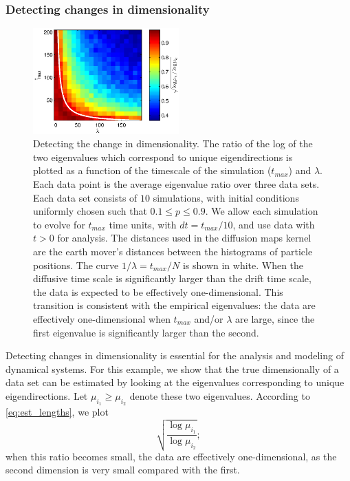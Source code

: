 \documentclass[preprint]{elsarticle}
\begin{document}
\subsubsection{Detecting changes in dimensionality}

\begin{figure}[t]
%
\centering
\includegraphics[width=0.5\textwidth]{tmax_lambda_transition}
%
\caption{Detecting the change in dimensionality. The ratio of the log of the two eigenvalues which correspond to unique eigendirections is plotted as a function of the timescale of the simulation ($t_{max}$) and $\lambda$. Each data point is the average eigenvalue ratio over three data sets. Each data set consists of $10$ simulations, with initial conditions uniformly chosen such that $0.1 \le p  \le 0.9$. We allow each simulation to evolve for $t_{max}$ time units, with $dt=t_{max}/10$, and use data with $t > 0$ for analysis. The distances used in the diffusion maps kernel are the earth mover's distances between the histograms of particle positions. The curve $1/\lambda = t_{max}/N$ is shown in white. When the diffusive time scale is significantly larger than the drift time scale, the data is expected to be effectively one-dimensional. This transition is consistent with the empirical eigenvalues: the data are effectively one-dimensional when $t_{max}$ and/or $\lambda$ are large, since the first eigenvalue is significantly larger than the second. }
%
\label{fig:chemotaxis_compare_timescales_evals}
%
\end{figure}

Detecting changes in dimensionality is essential for the analysis and modeling of dynamical systems. 
%
For this example, we show that the true dimensionally of a data set can be estimated by looking at the eigenvalues corresponding to unique eigendirections. 
%
%
%
Let $\mu_{i_1} \ge \mu_{i_2}$ denote these two eigenvalues. 
%
According to \eqref{eq:est_lengths}, we plot  
\begin{equation}\label{eq:chemotaxis_eval_ratio}
 \sqrt{\frac{\log \mu_{i_1}}{\log \mu_{i_2}}} ;
\end{equation}
when this ratio becomes small, the data are effectively one-dimensional, as the second dimension is very small compared with the first. 
%
\end{document}
